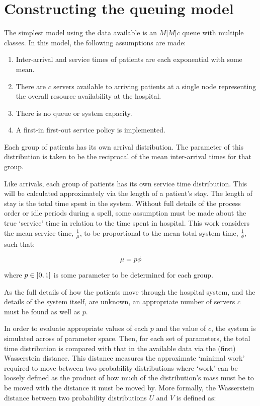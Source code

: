 \section{Constructing the queuing model}\label{sec:wasserstein}

The simplest model using the data available is an \(M|M|c\) queue with multiple
classes. In this model, the following assumptions are made:

\begin{enumerate}
    \item Inter-arrival and service times of patients are each exponential with
        some mean.
    \item There are $c$ servers available to arriving patients at a single node
        representing the overall resource availability at the hospital.
    \item There is no queue or system capacity.
    \item A first-in first-out service policy is implemented.
\end{enumerate}

Each group of patients has its own arrival distribution. The parameter of this
distribution is taken to be the reciprocal of the mean inter-arrival times for
that group.

Like arrivals, each group of patients has its own service time distribution.
This will be calculated approximately via the length of a patient's stay.
The length of stay is the total time spent in the system. Without full details
of the process order or idle periods during a spell, some assumption must be
made about the true `service' time in relation to the time spent in hospital.
This work considers the mean service time, \(\frac{1}{\mu}\), to be
proportional to the mean total system time, \(\frac{1}{\phi}\), such that:

\begin{equation}
    \mu = p \phi
\end{equation}

where \(p \in \interval[open left]{0}{1}\) is some parameter to be determined
for each group.

As the full details of how the patients move through the hospital system, and
the details of the system itself, are unknown, an appropriate number of servers
\(c\) must be found as well as \(p\).

In order to evaluate appropriate values of each \(p\) and the value of \(c\),
the system is simulated across of parameter space. Then, for each set of
parameters, the total time distribution is compared with that in the available
data via the (first) Wasserstein distance. This distance measures the
approximate `minimal work' required to move between two probability
distributions where `work' can be loosely defined as the product of how much of
the distribution's mass must be to be moved with the distance it must be moved
by. More formally, the Wasserstein distance between two probability
distributions \(U\) and \(V\) is defined as:


